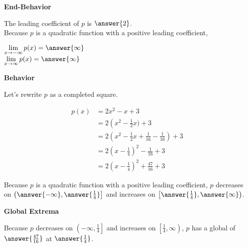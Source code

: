 \documentclass{ximera}
\begin{document}
\begin{exercise}
\begin{question}  \textbf{\textcolor{blue!55!black}{End-Behavior}}


The leading coefficient of $p$ is $\answer{2}$. \\


Because $p$ is a quadratic function with a positive leading coefficient,

$\lim\limits_{x \to -\infty} p(x) = \answer{\infty}$ \\


$\lim\limits_{x \to \infty} p(x) = \answer{\infty}$ \\

\end{question}




\begin{question}  \textbf{\textcolor{blue!55!black}{Behavior}}

Let's rewrite $p$ as a completed square.


\begin{align*}
p(x) & = 2x^2 - x + 3 \\
& = 2 \left( x^2 - \frac{1}{2} x) + 3  \\
& = 2 \left( x^2 - \frac{1}{2} x + \frac{1}{16} - \frac{1}{16} \right) + 3  \\
& = 2 \left( x - \frac{1}{4} \right)^2 - \frac{1}{16} + 3  \\
& = 2 \left( x - \frac{1}{4} \right)^2 + \frac{47}{16} + 3  
\end{align*}



Because $p$ is a quadratic function with a positive leading coefficient, $p$ decreases on $\left( \answer{-\infty}, \answer{\frac{1}{4}} \right]$ and increases on $\left[ \answer{\frac{1}{4}}, \answer{\infty} \right)$. 

\end{question}









\begin{question}  \textbf{\textcolor{blue!55!black}{Global Extrema}}

Because $p$ decreases on $\left( -\infty, \frac{1}{4} \right]$ and increases on $\left[ \frac{1}{4}, \infty \right)$, $p$ has a global   of $\answer{\frac{47}{16}}$ at $\answer{\frac{1}{4}}$.




\end{question}
\end{exercise}
\end{document}
